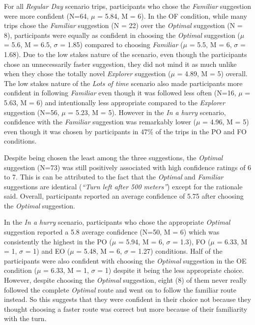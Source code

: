 For all \textit{Regular Day} scenario trips, participants who chose the \textit{Familiar} suggestion were more confident (N=64, $\mu$ =  5.84, M = 6). In the OF condition, while many trips chose the \textit{Familiar} suggestion (N = 22) over the \textit{Optimal} suggestion (N = 8), participants were equally as confident in choosing the \textit{Optimal} suggestion ($\mu$ =  5.6, M = 6.5, $\sigma$ = 1.85) compared to choosing \textit{Familiar} ($\mu$ =  5.5, M = 6, $\sigma$ = 1.68). Due to the low stakes nature of the scenario, even though the participants chose an unnecessarily faster suggestion, they did not mind it as much unlike when they chose the totally novel \textit{Explorer} suggestion ($\mu$ =  4.89, M = 5) overall. The low stakes nature of the \textit{Lots of time} scenario also made participants more confident in following \textit{Familiar} even though it was followed less often (N=16, $\mu$ =  5.63, M = 6) and intentionally less appropriate compared to the \textit{Explorer} suggestion (N=56, $\mu$ =  5.23, M = 5). However in the \textit{In a hurry} scenario, confidence with the \textit{Familiar} suggestion was remarkably lower ($\mu$ =  4.96, M = 5) even though it was chosen by participants in 47\% of the trips in the PO and FO conditions.

Despite being chosen the least among the three suggestions, the \textit{Optimal} suggestion (N=73) was still positively associated with high confidence ratings of 6 to 7. This is can be attributed to the fact that the \textit{Optimal} and \textit{Familiar} suggestions are identical (\textit{``Turn left after 500 meters''}) except for the rationale said. Overall, participants reported an average confidence of 5.75 after choosing the \textit{Optimal} suggestion.

In the \textit{In a hurry} scenario, participants who chose the appropriate \textit{Optimal} suggestion reported a 5.8 average confidence (N=50, M = 6) which was consistently the highest in the PO ($\mu$ =  5.94, M = 6, $\sigma$ = 1.3), FO ($\mu$ =  6.33, M = 1, $\sigma$ = 1) and EO ($\mu$ =  5.48, M = 6, $\sigma$ = 1.27) conditions. Half of the participants were also confident with choosing the \textit{Optimal} suggestion in the OE condition ($\mu$ =  6.33, M = 1, $\sigma$ = 1) despite it being the less appropriate choice. However, despite choosing the \textit{Optimal} suggestion, eight (8) of them never really followed the complete \textit{Optimal} route and went on to follow the familiar route instead. So this suggests that they were confident in their choice not because they thought choosing a faster route was correct but more because of their familiarity with the turn.

